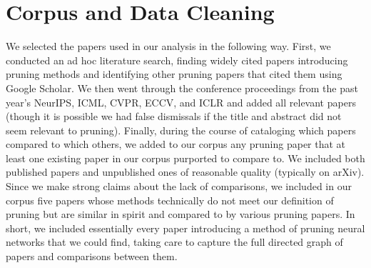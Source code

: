 


\section{Corpus and Data Cleaning} \label{sec:corpus}


We selected the \npapers papers used in our analysis in the following way. First, we conducted an ad hoc literature search, finding widely cited papers introducing pruning methods and identifying other pruning papers that cited them using Google Scholar. We then went through the conference proceedings from the past year's NeurIPS, ICML, CVPR, ECCV, and ICLR and added all relevant papers (though it is possible we had false dismissals if the title and abstract did not seem relevant to pruning). Finally, during the course of cataloging which papers compared to which others, we added to our corpus any pruning paper that at least one existing paper in our corpus purported to compare to. We included both published papers and unpublished ones of reasonable quality (typically on arXiv). Since we make strong claims about the lack of comparisons, we included in our corpus five papers whose methods technically do not meet our definition of pruning but are similar in spirit and compared to by various pruning papers.
In short, we included essentially every paper introducing a method of pruning neural networks that we could find, taking care to capture the full directed graph of papers and comparisons between them.

